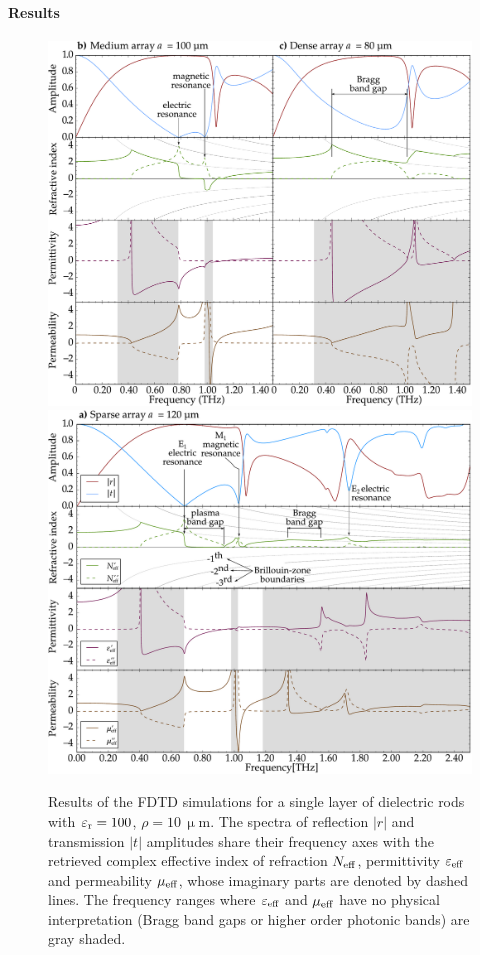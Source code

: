 \paragraph{Results}
\begin{figure} \centering%
\includegraphics[width=115mm]{img/ERods_eps100_double_a100a080_FDTD.pdf}
\includegraphics[width=115mm]{img/ERods_eps100_single_a120_FDTD.pdf}
\caption{Results of the FDTD simulations for a single layer of dielectric rods with $\varepsilon_{\rm r}= 100$, $\rho=10$\,$\upmu$m. The spectra of reflection $|r|$ and transmission $|t|$ amplitudes share their frequency axes with the retrieved complex effective index of refraction $N_{\text{eff} }$, permittivity $\varepsilon_{\text{eff} }$ and permeability $\mu_{\text{eff} }$, whose imaginary parts are denoted by dashed lines. The frequency ranges where $\varepsilon_{\text{eff} }$ and $\mu_{\text{eff} }$ have no physical interpretation (Bragg band gaps or higher order photonic bands) are gray shaded.  } \label{fg_spec}
\end{figure}

